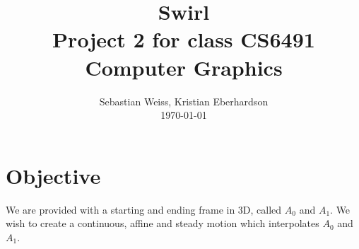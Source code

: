 \documentclass[journal, letterpaper]{IEEEtran}
\begin{document}
\title{Swirl\\
	{\large Project 2 for class CS6491 Computer Graphics}}
\author{Sebastian Weiss, Kristian Eberhardson\\ \today}

\maketitle


\section{Objective}
We are provided with a starting and ending frame in 3D, called $A_0$ and $A_1$. We wish to create a continuous, affine and steady motion which interpolates $A_0$ and $A_1$.
 
\end{document}
